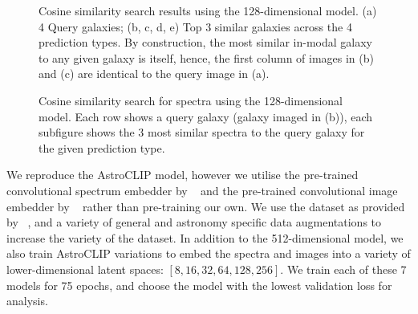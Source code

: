 \documentclass[a4paper,11pt]{article}
\begin{document}
\begin{figure}[t]
    \centering
    \caption{Cosine similarity search results using the 128-dimensional model. (a) 4 Query galaxies;
        (b, c, d, e) Top 3 similar galaxies across the 4 prediction types.
        By construction, the most similar in-modal galaxy to any given galaxy is itself, hence, the first column of images
        in (b) and (c) are identical to the query image in (a).}
    \label{fig:ssia}
\end{figure}

\begin{figure}[t]
    \centering
    \caption{Cosine similarity search for spectra using the 128-dimensional model.
    Each row shows a query galaxy (galaxy imaged in (b)), each subfigure shows the 3 most similar spectra to the query galaxy
       for the given prediction type.}
    \label{fig:sss}
\end{figure}

We reproduce the AstroCLIP model, however we utilise the pre-trained convolutional spectrum embedder by ~\cite{liang2023}
and the pre-trained convolutional image embedder by ~\cite{stein2021} rather than pre-training our own.
We use the dataset as provided by ~\cite{astroclip}, and a variety of general and astronomy specific data augmentations
to increase the variety of the dataset.
In addition to the 512-dimensional model, we also train AstroCLIP variations to embed the spectra and images into
a variety of lower-dimensional latent spaces: $[8, 16, 32, 64, 128, 256]$.
We train each of these 7 models for 75 epochs, and choose the model with the lowest validation loss for analysis.
\end{document}
